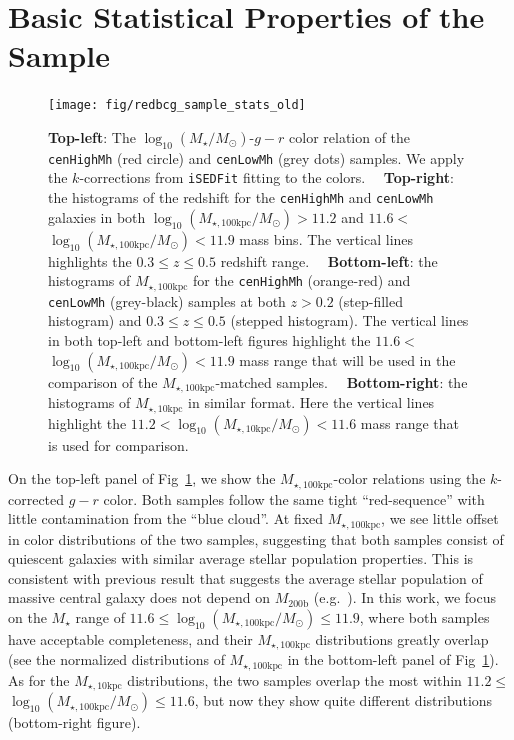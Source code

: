 \documentclass[a4paper,fleqn,usenatbib]{mnras}
\def\rbcg{\texttt{cenHighMh}}
\def\nbcg{\texttt{cenLowMh}}
\def\mstar{{$M_{\star}$}}
\def\mhalo{{$M_{\mathrm{200b}}$}}
\def\logms{{$\log_{10} (M_{\star}/M_{\odot})$}}
\def\minn{{$M_{\star,10\mathrm{kpc}}$}}
\def\mtot{{$M_{\star,100\mathrm{kpc}}$}}
\def\logminn{{$\log_{10} (M_{\star,10\mathrm{kpc}}/M_{\odot})$}}
\def\logmtot{{$\log_{10} (M_{\star,100\mathrm{kpc}}/M_{\odot})$}}
\begin{document}
\appendix


\section{Basic Statistical Properties of the Sample} 
	\label{app:basic} 
    
  \begin{figure}
      \centering 
      \texttt{[image: fig/redbcg\_sample\_stats\_old]}
      \caption{
          \textbf{Top-left}: The \logms{}-$g-r$ color relation of the \rbcg{} 
          (red circle) and \nbcg{} (grey dots) samples.
          We apply the $k$-corrections from \texttt{iSEDFit} fitting to the colors.~~          
          \textbf{Top-right}: the histograms of the redshift for the \rbcg{} and 
          \nbcg{} galaxies in both \logmtot$>11.2$ and $11.6<$\logmtot{}$<11.9$
          mass bins.
          The vertical lines highlights the $0.3\leq z \leq 0.5$ redshift range.~~
          \textbf{Bottom-left}: the histograms of \mtot{} for the \rbcg{} (orange-red) 
          and \nbcg{} (grey-black) samples at both $z>0.2$ (step-filled histogram) and 
          $0.3 \leq z \leq 0.5$ (stepped histogram). 
          The vertical lines in both top-left and bottom-left figures highlight the 
          $11.6<$\logmtot{}$<11.9$ mass range that will be used in the comparison of 
          the \mtot{}-matched samples.~~
          \textbf{Bottom-right}: the histograms of \minn{} in similar format. 
          Here the vertical lines highlight the 
          $11.2<$\logminn{}$<11.6$ mass range that is used for comparison.
      }
      \label{fig:sample_stats}
  \end{figure}

    On the top-left panel of Fig~\ref{fig:sample_stats}, we show the \mtot{}-color 
    relations using the $k$-corrected $g-r$ color. 
    Both samples follow the same tight ``red-sequence'' with little contamination 
    from the ``blue cloud''.
    At fixed \mtot{}, we see little offset in color distributions of the two 
    samples, suggesting that both samples consist of quiescent galaxies with 
    similar average stellar population properties.  
    This is consistent with previous result that suggests the average stellar 
    population of massive central galaxy does not depend on \mhalo{} 
    (e.g.\ \citealt{Park2007}).  
    In this work, we focus on the \mstar{} range of $11.6 \le$\logmtot{}$\le 11.9$, 
    where both samples have acceptable completeness, and their \mtot{} distributions 
    greatly overlap (see the normalized distributions of \mtot{} in the bottom-left 
    panel of Fig~\ref{fig:sample_stats}). 
    As for the \minn{} distributions, the two samples overlap the most within 
    $11.2 \le$\logmtot{}$\le 11.6$, but now they show quite different
    distributions (bottom-right figure).
    
\end{document}
